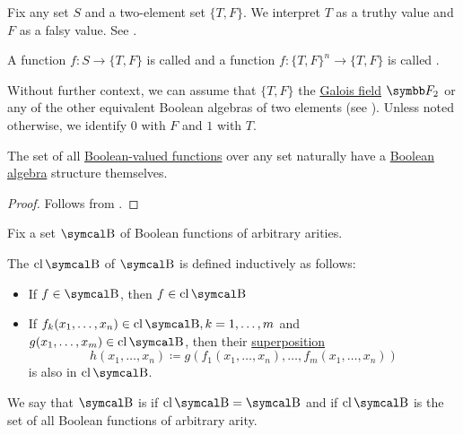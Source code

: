 \begin{definition}\label{def:boolean_function}
  Fix any set \( S \) and a two-element set \( \{ T, F \} \). We interpret \( T \) as a truthy value and \( F \) as a falsy value. See .

  A function \( f: S \to \{ T, F \} \) is called  and a function \( f: \{ T, F \}^n \to \{ T, F \} \) is called .

  Without further context, we can assume that \( \{ T, F \} \) the \hyperref[thm:galois_field_existence]{Galois field} \( \BF_2 \) or any of the other equivalent Boolean algebras of two elements (see ). Unless noted otherwise, we identify \( 0 \) with \( F \) and \( 1 \) with \( T \).
\end{definition}

\begin{proposition}\label{thm:boolean_functions_form_boolean_algebra}
  The set of all \hyperref[def:boolean_function]{Boolean-valued functions} over any set naturally have a \hyperref[def:boolean_algebra]{Boolean algebra} structure themselves.
\end{proposition}
\begin{proof}
  Follows from .
\end{proof}

\begin{definition}\label{def:boolean_closure}
  Fix a set \( \CB \) of Boolean functions of arbitrary arities.

  The  \( \Cl{\CB} \) of \( \CB \) is defined inductively as follows:
  \begin{itemize}
    \item If \( f \in \CB \), then \( f \in \Cl{\CB} \)
    \item If \( f_k(x_1, \ldots, x_n) \in \Cl{\CB}, k = 1, \ldots, m \) and \( g(x_1, \ldots, x_m) \in \Cl{\CB} \), then their \hyperref[def:function/superposition]{superposition}
    \begin{equation*}
      h(x_1, \ldots, x_n) \coloneqq g(f_1(x_1, \ldots, x_n), \ldots, f_m(x_1, \ldots, x_n))
    \end{equation*}
    is also in \( \Cl{\CB} \).
  \end{itemize}

  We say that \( \CB \) is  if \( \Cl{\CB} = \CB \) and  if \( \Cl{\CB} \) is the set of all Boolean functions of arbitrary arity.
\end{definition}

